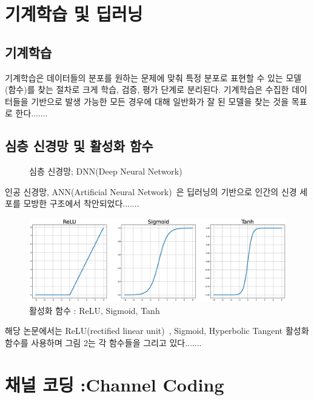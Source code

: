 \documentclass[11pt]{oblivoir}
\begin{document}
\newpage

\section{\centering 기계학습 및 딥러닝}
\subsection{기계학습}

기계학습은 데이터들의 분포를 원하는 문제에 맞춰 특정 분포로 표현할 수 있는 모델(함수)를 찾는 절차로 크게 학습, 검증, 평가 단계로 분리된다. 기계학습은 수집한 데이터들을 기반으로 발생 가능한 모든 경우에 대해 일반화가 잘 된 모델을 찾는 것을 목표로 한다.......

\subsection{심층 신경망 및 활성화 함수}

\begin{figure}[h!]
    \centering
    \DrawDNN
    \caption{심층 신경망; DNN(Deep Neural Network)}
    \label{fig:my_label}
\end{figure}

인공 신경망, ANN(Artificial Neural Network)~\cite{McCulloch1990ALC}은 딥러닝의 기반으로 인간의 신경 세포를 모방한 구조에서 착안되었다.......

\begin{figure}[h!]
\vspace{2em}
\includegraphics[width=1\columnwidth]{figure/activation.eps}
\vspace{2em}
\caption{활성화 함수 : ReLU, Sigmoid, Tanh}
\label{fig:activation}
\end{figure}

해당 논문에서는 ReLU(rectified linear unit)~\cite{nair2010rectified}, Sigmoid, Hyperbolic Tangent 활성화 함수를 사용하며 그림 2는 각 함수들을 그리고 있다.......

\newpage

\section{\centering 채널 코딩 :Channel Coding}
\end{document}
